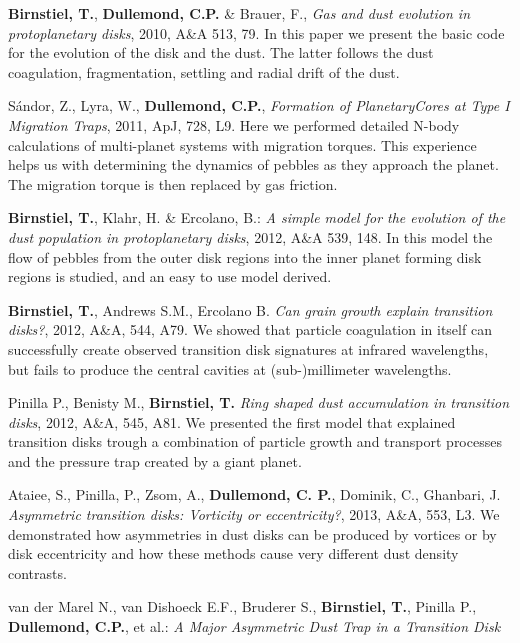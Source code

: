 \documentclass[10pt,fleqn,twoside]{article}
\begin{document}
\begin{literature}
\item \textbf{Birnstiel, T.}, \textbf{Dullemond, C.P.} \& Brauer, F.,
  \textit{Gas and dust evolution in protoplanetary disks}, 2010, A\&A
  513, 79. In this paper we present the basic code for the evolution
  of the disk and the dust.
  The latter follows the dust coagulation, fragmentation, settling and
  radial drift of the dust.
\item S\'andor, Z., Lyra, W., \textbf{Dullemond, C.P.}, {\em Formation
  of PlanetaryCores at Type I Migration Traps}, 2011, ApJ, 728, L9.
  Here we performed detailed N-body calculations of multi-planet
  systems with migration torques. This experience helps us with
  determining the dynamics of pebbles as they approach the planet. The
  migration torque is then replaced by gas friction.
\item \textbf{Birnstiel, T.}, Klahr, H. \& Ercolano, B.: \textit{A
  simple model for the evolution of the dust population in
  protoplanetary disks}, 2012, A\&A 539, 148. In this model the flow
  of pebbles from the outer disk regions into the inner planet forming
  disk regions is studied, and an easy to use model derived.
\item \textbf{Birnstiel, T.}, Andrews S.M., Ercolano B. \textit{Can
  grain growth explain transition disks?}, 2012, A\&A, 544, A79. We
  showed that particle coagulation in itself can successfully create
  observed transition disk signatures at infrared wavelengths, but
  fails to produce the central cavities at (sub-)millimeter
  wavelengths.
\item Pinilla P., Benisty M., \textbf{Birnstiel, T.} \textit{Ring
  shaped dust accumulation in transition disks}, 2012, A\&A, 545, A81.
  We presented the first model that explained transition disks trough
  a combination of particle growth and transport processes and the
  pressure trap created by a giant planet.
\item Ataiee, S., Pinilla, P., Zsom, A., \textbf{Dullemond, C. P.},
  Dominik, C., Ghanbari, J. \textit{Asymmetric transition disks:
  Vorticity or eccentricity?}, 2013, A\&A, 553, L3. We demonstrated
  how asymmetries in dust disks can be produced by vortices or by disk
  eccentricity and how these methods cause very different dust density
  contrasts. 
\item van der Marel N., van Dishoeck E.F., Bruderer S.,
  \textbf{Birnstiel, T.}, Pinilla P., \textbf{Dullemond, C.P.}, et
  al.: \textit{A Major Asymmetric Dust Trap in a Transition Disk}

\end{literature}
\end{document}
